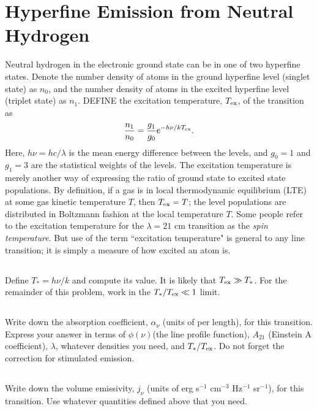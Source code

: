\documentclass[11pt]{article}
\begin{document}
\def\Tex{{T_{\rm ex}}}
\section{Hyperfine Emission from Neutral Hydrogen}

Neutral hydrogen in the electronic ground state can be in one of two hyperfine
states. Denote the number density of atoms in the ground hyperfine level
(singlet state) as $n_0$, and the number density of atoms in the excited hyperfine
level (triplet state) as $n_1$. DEFINE the excitation temperature, $\Tex$, of the
transition as
\begin{equation}
\frac{n_1}{n_0}=\frac{g_1}{g_0}e^{-h\nu/k\Tex}.
\end{equation}
Here, $h\nu=hc/\lambda$ is the mean energy difference between the levels, and
$g_0=1$ and $g_1=3$ are the statistical weights of the levels. The excitation
temperature is merely another way of expressing the ratio of ground state to
excited state populations. By definition, if a gas is in local thermodynamic
equilibrium (LTE) at some gas kinetic temperature $T$, then $\Tex = T$; the level
populations are distributed in Boltzmann fashion at the local temperature $T$.
Some people refer to the excitation temperature for the $\lambda = 21$ cm transition as
the {\it spin temperature}. But use of the term ``excitation temperature" is general
to any line transition; it is simply a measure of how excited an atom is.

\def\Ts{{T_*}}
\subsection{}
Define $\Ts=h\nu/k$ and compute its value.
It is likely that $\Tex\gg\Ts$. For the remainder of this problem, work in the $\Ts/\Tex\ll1$
limit.

\subsection{}
Write down the absorption coefficient, $\alpha_\nu$ (units of per length), for
this transition. Express your answer in terms of $\phi(\nu)$(the line profile
function), $A_{21}$ (Einstein A coefficient), $\lambda$, whatever densities you need, and
$\Ts/\Tex$. Do not forget the correction for stimulated emission.

\subsection{}
Write down the volume emissivity, $j_\nu$ (units of erg s$^{-1}$ cm$^{-3}$ Hz$^{-1}$ sr$^{-1}$), for
this transition. Use whatever quantities defined above that you need.
\end{document}
